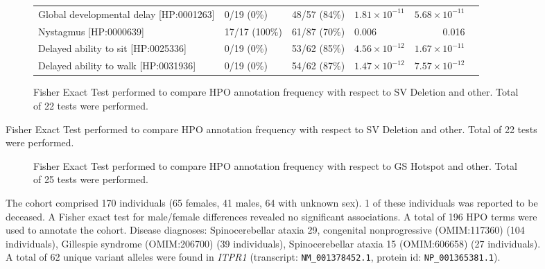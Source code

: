 \begin{figure}[htbp]
\begin{subfigure}[b]{0.95\textwidth}
{\begin{tabular}{llllrr}
Global developmental delay [HP:0001263] & 0/19 (0\%) & 48/57 (84\%) & $1.81\times 10^{-11}$ & $5.68\times 10^{-11}$\\
Nystagmus [HP:0000639] & 17/17 (100\%) & 61/87 (70\%) & 0.006 & 0.016\\
Delayed ability to sit [HP:0025336] & 0/19 (0\%) & 53/62 (85\%) & $4.56\times 10^{-12}$ & $1.67\times 10^{-11}$\\
Delayed ability to walk [HP:0031936] & 0/19 (0\%) & 54/62 (87\%) & $1.47\times 10^{-12}$ & $7.57\times 10^{-12}$\\
\bottomrule
\end{tabular}
}
\captionsetup{justification=raggedright,singlelinecheck=false}
\caption{Fisher Exact Test performed to compare HPO annotation frequency with respect to SV Deletion and other. Total of 22 tests were performed.}
\end{subfigure}
\end{figure}


\begin{figure}[htbp]\ContinuedFloat
\begin{subfigure}[b]{0.95\textwidth}
\centering
{}
\captionsetup{justification=raggedright,singlelinecheck=false}
\caption{Fisher Exact Test performed to compare HPO annotation frequency with respect to GS Hotspot and other. Total of
        25 tests were performed. }
\end{subfigure}

\vspace{0.2em}

\caption{The cohort comprised 170 individuals (65 females, 41 males, 64 with unknown sex). 1 of these individuals was reported to be deceased. 
A Fisher exact test for male/female differences revealed no significant associations.
A total of 196 HPO terms were used to annotate the cohort. Disease diagnoses: Spinocerebellar ataxia 29, congenital nonprogressive (OMIM:117360) (104 individuals), Gillespie syndrome (OMIM:206700) (39 individuals), Spinocerebellar ataxia 15 (OMIM:606658) (27 individuals). A total of 62 unique variant alleles were found in \textit{ITPR1} (transcript: \texttt{NM\_001378452.1}, protein id: \texttt{NP\_001365381.1}).}
\end{figure}
